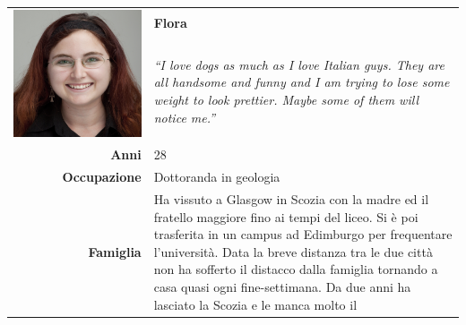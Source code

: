\begin{table}[H]
	\begin{centering}
	\begin{tabular} { | r  p{10cm} | }
		\hline
		\multirow{2}{*}{
			\begin{minipage}{.18 \textheight}
				\vspace{0.1in}
				\includegraphics[width=\linewidth]{img/personas/flora.png}
			\end{minipage}
		}
		 & \vspace{0.1 in}\Large\textbf{Flora} \\ 
		& \vspace{0.1 in}\large{\emph{``I love dogs as much as I
love Italian guys. They are all handsome and funny and I am trying to
	lose some weight to look prettier. Maybe some of them will notice
me.''}}\\[8ex] 
		\hline
		\textbf{Anni} & 28 \\ \hline
		\textbf{Occupazione} & Dottoranda in geologia \\ \hline
		\textbf{Famiglia} & {Ha vissuto a Glasgow in Scozia con la madre
ed il fratello maggiore fino ai tempi del liceo. Si è poi trasferita in
un campus ad
Edimburgo per frequentare l'università. Data la breve distanza tra le
due città non ha sofferto il distacco dalla famiglia tornando a casa
quasi ogni fine-settimana. Da due anni ha lasciato la Scozia e le manca molto il
}
\end{tabular}
\end{centering}
\end{table}
